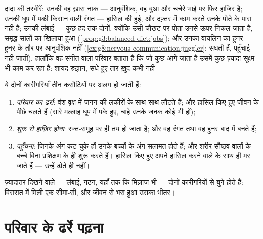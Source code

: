 \begin{example}[परिवार का एलबम छाँटना]\label{ex:g9:heredity-and-traits:album}
दादा की तस्वीरें: उनकी वह ख़ास नाक --- आनुवंशिक, वह बुआ और चचेरे भाई पर
फिर हाज़िर है; उनकी धूप में पकी किसान वाली रंगत --- हासिल की हुई, और
दफ़्तर में काम करते उनके पोते के पास नहीं है; उनकी लंबाई --- कुछ हद तक
दोनों, क्योंकि उसी चौखट पर पोता उनसे ऊपर निकल जाता है, समृद्ध सालों का
खिलाया हुआ (\cref{prop:g3:balanced-diet:jobs}); और उनका वायलिन का हुनर
--- हुनर के तौर पर आनुवंशिक नहीं
(\cref{ex:g8:nervous-communication:juggler}:  सधती हैं,
पहुँचाई नहीं जातीं), हालाँकि वह संगीत वाला परिवार बताता है कि जो कुछ
आगे जाता है उसमें कुछ ज़्यादा सूक्ष्म भी काम कर रहा है: शायद रुझान,
सधे हुए तार ख़ुद कभी नहीं।
\end{example}

\begin{proposition}[विरासत में मिला और हासिल किया हुआ]\label{prop:g9:heredity-and-traits:sorting}
ये दोनों कारीगरियाँ तीन कसौटियों पर अलग हो जाती हैं:
\begin{enumerate}
  \item \emph{परिवार का ढर्रा}:  वंश-वृक्ष में जनन की
        लकीरों के साथ-साथ लौटते हैं; और हासिल किए हुए  जीवन के
        पीछे चलते हैं (सारे मल्लाह धूप में पके हुए, चाहे उनके जनक कोई
        भी हों);
  \item \emph{शुरू से हाज़िर होना}: रक्त-समूह  पर ही तय हो जाता
        है; और वह रंगत तथा वह हुनर बाद में बनते हैं;
  \item \emph{पहुँचना}: जिनके अंग कट चुके हों उनके बच्चों के अंग
        सलामत होते हैं; और शरीर सौष्ठव वालों के बच्चे बिना प्रशिक्षण के
        ही शुरू करते हैं। हासिल किए हुए  अपने हासिल करने वाले के
        साथ ही मर जाते हैं ---  उन्हें ढोते ही नहीं।
\end{enumerate}
ज़्यादातर दिखने वाले  --- लंबाई, गठन, यहाँ तक कि मिज़ाज भी ---
दोनों कारीगरियों से बुने होते हैं: विरासत में मिली एक सीमा-सी, और जीवन
से भरा हुआ उसका भीतर।
\end{proposition}
\admitted

\section{परिवार के ढर्रे पढ़ना}

